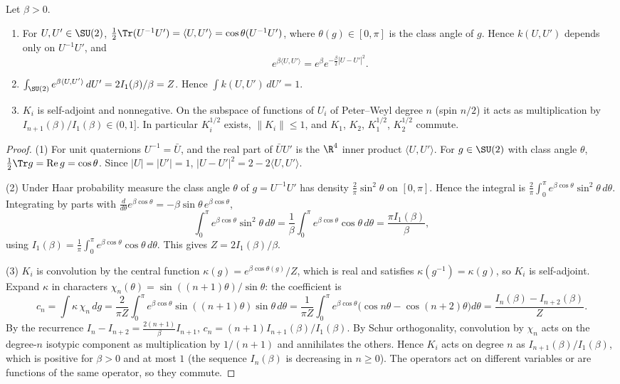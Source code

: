 \begin{lemma}\label{tu:U-kernel}
Let $\beta>0$.
\begin{enumerate}
\item For $U,U'\in\SU(2)$, $\tfrac12\Tr(U^{-1}U')=\langle U,U'\rangle=\cos\theta(U^{-1}U')$, where
$\theta(g)\in[0,\pi]$ is the class angle of $g$. Hence $k(U,U')$ depends only on $U^{-1}U'$, and
\[
e^{\beta\langle U,U'\rangle}=e^{\beta}e^{-\frac\beta2|U-U'|^2}.
\]
\item $\int_{\SU(2)}e^{\beta\langle U,U'\rangle}\,dU'=2I_1(\beta)/\beta=Z$. Hence $\int k(U,U')\,dU'=1$.
\item $K_i$ is self-adjoint and nonnegative. On the subspace of functions of $U_i$ of Peter--Weyl degree
$n$ (spin $n/2$) it acts as multiplication by $I_{n+1}(\beta)/I_1(\beta)\in(0,1]$. In particular
$K_i^{1/2}$ exists, $\|K_i\|\le1$, and $K_1$, $K_2$, $K_1^{1/2}$, $K_2^{1/2}$ commute.
\end{enumerate}
\end{lemma}

\begin{proof}
(1) For unit quaternions $U^{-1}=\bar U$, and the real part of $\bar UU'$ is the $\R^4$ inner product
$\langle U,U'\rangle$. For $g\in\SU(2)$ with class angle $\theta$, $\tfrac12\Tr g=\operatorname{Re}g=\cos\theta$.
Since $|U|=|U'|=1$, $|U-U'|^2=2-2\langle U,U'\rangle$.

(2) Under Haar probability measure the class angle $\theta$ of $g=U^{-1}U'$ has density
$\frac2\pi\sin^2\theta$ on $[0,\pi]$. Hence the integral is
$\frac2\pi\int_0^\pi e^{\beta\cos\theta}\sin^2\theta\,d\theta$. Integrating by parts with
$\frac{d}{d\theta}e^{\beta\cos\theta}=-\beta\sin\theta\,e^{\beta\cos\theta}$,
\[
\int_0^\pi e^{\beta\cos\theta}\sin^2\theta\,d\theta=\frac1\beta\int_0^\pi e^{\beta\cos\theta}\cos\theta\,d\theta
=\frac{\pi I_1(\beta)}{\beta},
\]
using $I_1(\beta)=\frac1\pi\int_0^\pi e^{\beta\cos\theta}\cos\theta\,d\theta$. This gives $Z=2I_1(\beta)/\beta$.

(3) $K_i$ is convolution by the central function $\kappa(g)=e^{\beta\cos\theta(g)}/Z$, which is real and
satisfies $\kappa(g^{-1})=\kappa(g)$, so $K_i$ is self-adjoint. Expand $\kappa$ in characters
$\chi_n(\theta)=\sin((n+1)\theta)/\sin\theta$: the coefficient is
\[
c_n=\int\kappa\,\chi_n\,dg=\frac{2}{\pi Z}\int_0^\pi e^{\beta\cos\theta}\sin((n+1)\theta)\sin\theta\,d\theta
=\frac{1}{\pi Z}\int_0^\pi e^{\beta\cos\theta}\bigl(\cos n\theta-\cos(n+2)\theta\bigr)d\theta
=\frac{I_n(\beta)-I_{n+2}(\beta)}{Z}.
\]
By the recurrence $I_n-I_{n+2}=\frac{2(n+1)}{\beta}I_{n+1}$, $c_n=(n+1)I_{n+1}(\beta)/I_1(\beta)$. By Schur
orthogonality, convolution by $\chi_n$ acts on the degree-$n$ isotypic component as multiplication by
$1/(n+1)$ and annihilates the others. Hence $K_i$ acts on degree $n$ as $I_{n+1}(\beta)/I_1(\beta)$, which is
positive for $\beta>0$ and at most $1$ (the sequence $I_{n}(\beta)$ is decreasing in $n\ge0$). The
operators act on different variables or are functions of the same operator, so they commute.
\end{proof}

